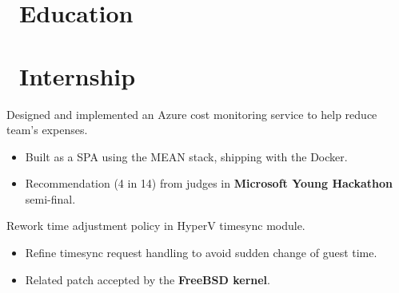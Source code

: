 \documentclass{resume}
\begin{document}



\section{\faGraduationCap\ Education}

\section{\faBriefcase\ Internship}
Designed and implemented an Azure cost monitoring service to help reduce team's expenses.
\begin{itemize}[leftmargin=*]
  \item {Built as a SPA using the MEAN stack, shipping with the Docker.}
  \item {Recommendation (4 in 14) from judges in \textbf{Microsoft Young Hackathon} semi-final.}
\end{itemize}
Rework time adjustment policy in HyperV timesync module.
\begin{itemize}[leftmargin=*]
  \item {Refine timesync request handling to avoid sudden change of guest time.}
  \item {Related patch accepted by the \textbf{FreeBSD kernel}.}
\end{itemize}
\end{document}
